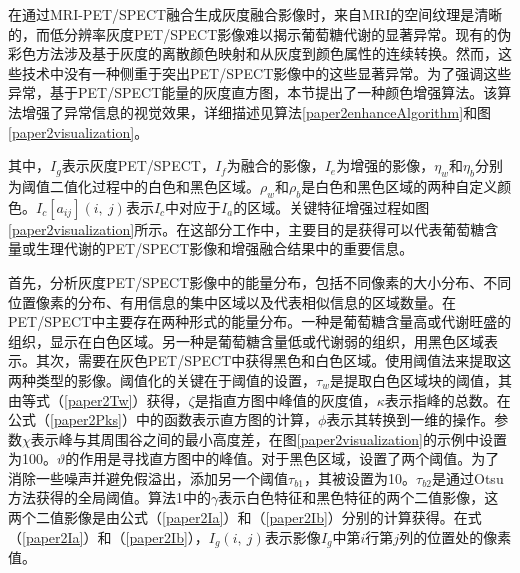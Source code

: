 在通过MRI-PET/SPECT融合生成灰度融合影像时，来自MRI的空间纹理是清晰的，而低分辨率灰度PET/SPECT影像难以揭示葡萄糖代谢的显著异常。现有的伪彩色方法涉及基于灰度的离散颜色映射和从灰度到颜色属性的连续转换。然而，这些技术中没有一种侧重于突出PET/SPECT影像中的这些显著异常。为了强调这些异常，基于PET/SPECT能量的灰度直方图，本节提出了一种颜色增强算法。该算法增强了异常信息的视觉效果，详细描述见算法\ref{paper2enhanceAlgorithm}和图\ref{paper2visualization}。


其中，$I_g$表示灰度PET/SPECT，$I_f$为融合的影像，$I_e$为增强的影像，$\eta_w$和$\eta_b$分别为阈值二值化过程中的白色和黑色区域。$\rho_w$和$\rho_b$是白色和黑色区域的两种自定义颜色。$I_c[a_{ij}](i,~j)$表示$I_c$中对应于$I_a$的区域。关键特征增强过程如图\ref{paper2visualization}所示。在这部分工作中，主要目的是获得可以代表葡萄糖含量或生理代谢的PET/SPECT影像和增强融合结果中的重要信息。


首先，分析灰度PET/SPECT影像中的能量分布，包括不同像素的大小分布、不同位置像素的分布、有用信息的集中区域以及代表相似信息的区域数量。在PET/SPECT中主要存在两种形式的能量分布。一种是葡萄糖含量高或代谢旺盛的组织，显示在白色区域。另一种是葡萄糖含量低或代谢弱的组织，用黑色区域表示。其次，需要在灰色PET/SPECT中获得黑色和白色区域。使用阈值法来提取这两种类型的影像。阈值化的关键在于阈值的设置，$\tau_w$是提取白色区域块的阈值，其由等式（\ref{paper2Tw}）获得，$\zeta$是指直方图中峰值的灰度值，$\kappa$表示指峰的总数。在公式（\ref{paper2Pks}）中的函数表示直方图的计算，$\phi$表示其转换到一维的操作。参数$\chi$表示峰与其周围谷之间的最小高度差，在图\ref{paper2visualization}的示例中设置为100。$\vartheta$的作用是寻找直方图中的峰值。对于黑色区域，设置了两个阈值。为了消除一些噪声并避免假溢出，添加另一个阈值$\tau_{b1}$，其被设置为10。$\tau_{b2}$是通过Otsu方法获得的全局阈值。算法1中的$\gamma$表示白色特征和黑色特征的两个二值影像，这两个二值影像是由公式（\ref{paper2Ia}）和（\ref{paper2Ib}）分别的计算获得。在式（\ref{paper2Ia}）和（\ref{paper2Ib}），$I_{g}(i,~j)$表示影像$I_{g}$中第$i$行第$j$列的位置处的像素值。
 
